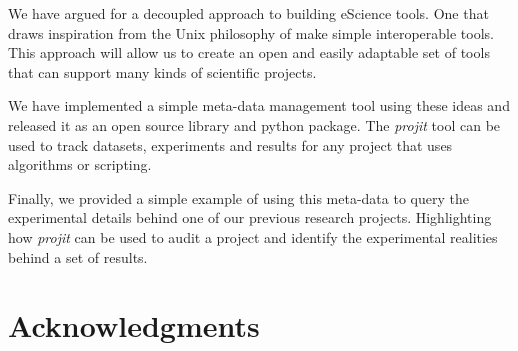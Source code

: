 \documentclass[sigconf]{acmart}
\begin{document}
We have argued for a decoupled approach to building eScience tools. One that draws inspiration from the Unix
philosophy of make simple interoperable tools. This approach will allow us to create an open and easily 
adaptable set of tools that can support many kinds of scientific projects. 

We have implemented a simple meta-data management tool using these ideas and released it as an open source 
library and python package. The \emph{projit} tool can be used to track datasets, experiments and results
for any project that uses algorithms or scripting.

Finally, we provided a simple example of using this meta-data to query the experimental details behind one
of our previous research projects. Highlighting how \emph{projit} can be used to audit a project and identify
the experimental realities behind a set of results. 


\section{Acknowledgments}




\end{document}
